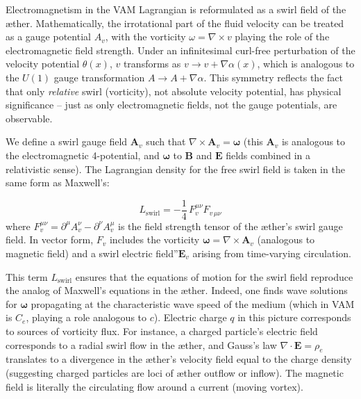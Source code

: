 Electromagnetism in the VAM Lagrangian is reformulated as a swirl field of the æther. Mathematically, the irrotational part of the fluid velocity can be treated as a gauge potential $A_v$, with the vorticity $\omega = \nabla \times v$ playing the role of the electromagnetic field strength. Under an infinitesimal curl-free perturbation of the velocity potential $\theta(x)$, $v$ transforms as $v \to v + \nabla \alpha(x)$, which is analogous to the $U(1)$ gauge transformation $A \to A + \nabla \alpha$. This symmetry reflects the fact that only \textit{relative} swirl (vorticity), not absolute velocity potential, has physical significance – just as only electromagnetic fields, not the gauge potentials, are observable.


We define a swirl gauge field $\mathbf{A}_v$ such that $\nabla \times \mathbf{A}_v = \mathbf{\omega}$ (this $\mathbf{A}_v$ is analogous to the electromagnetic 4-potential, and $\mathbf{\omega}$ to $\mathbf{B}$ and $\mathbf{E}$ fields combined in a relativistic sense). The Lagrangian density for the free swirl field is taken in the same form as Maxwell's:

\begin{equation}
    L_{\text{swirl}} = -\frac{1}{4}\, F_{v}^{\mu\nu} F_{v\,\mu\nu}
    \label{eq:swirl-lagrangian}
\end{equation}
where $F_v^{\mu\nu} = \partial^\mu A_v^{\nu} - \partial^\nu A_v^{\mu}$ is the field strength tensor of the æther's swirl gauge field. In vector form, $F_v$ includes the vorticity $\mathbf{\omega} = \nabla \times \mathbf{A}_v$ (analogous to magnetic field) and a \grqq swirl electric field\textquotedblright $\mathbf{E}_v$ arising from time-varying circulation.


This term $L_{\text{swirl}}$ ensures that the equations of motion for the swirl field reproduce the analog of Maxwell's equations in the æther. Indeed, one finds wave solutions for $\mathbf{\omega}$ propagating at the characteristic wave speed of the medium (which in VAM is $C_e$, playing a role analogous to $c$). Electric charge $q$ in this picture corresponds to sources of vorticity flux. For instance, a charged particle's electric field corresponds to a radial swirl flow in the æther, and Gauss's law $\nabla\cdot \mathbf{E} = \rho_e$ translates to a divergence in the æther's velocity field equal to the charge density (suggesting charged particles are loci of æther outflow or inflow). The magnetic field is literally the circulating flow around a current (moving vortex).


